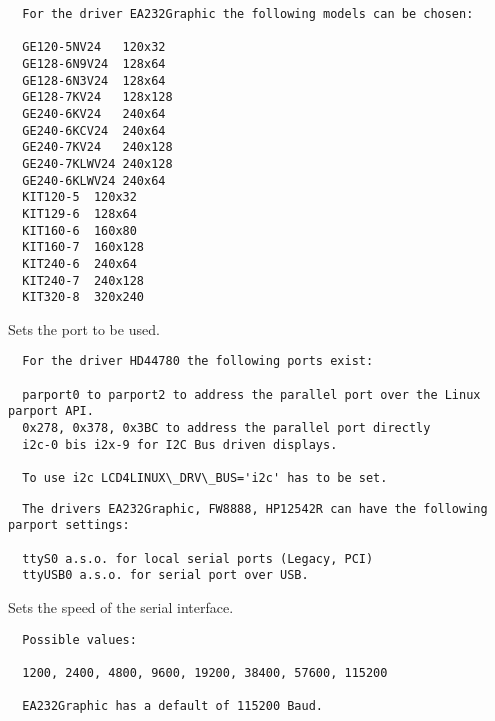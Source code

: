 \begin{description}
\begin{example}
\begin{verbatim}
  For the driver EA232Graphic the following models can be chosen:

  GE120-5NV24	120x32
  GE128-6N9V24	128x64
  GE128-6N3V24	128x64
  GE128-7KV24	128x128
  GE240-6KV24	240x64
  GE240-6KCV24	240x64
  GE240-7KV24	240x128
  GE240-7KLWV24	240x128
  GE240-6KLWV24	240x64
  KIT120-5	120x32
  KIT129-6	128x64
  KIT160-6	160x80
  KIT160-7	160x128
  KIT240-6	240x64
  KIT240-7	240x128
  KIT320-8	320x240
\end{verbatim}
\end{example}


  Sets the port to be used.

\begin{example}
\begin{verbatim}
  For the driver HD44780 the following ports exist:

  parport0 to parport2 to address the parallel port over the Linux parport API.
  0x278, 0x378, 0x3BC to address the parallel port directly
  i2c-0 bis i2x-9 for I2C Bus driven displays.

  To use i2c LCD4LINUX\_DRV\_BUS='i2c' has to be set.
\end{verbatim}
\end{example}

\begin{example}
\begin{verbatim}
  The drivers EA232Graphic, FW8888, HP12542R can have the following parport settings:

  ttyS0 a.s.o. for local serial ports (Legacy, PCI)
  ttyUSB0 a.s.o. for serial port over USB.
\end{verbatim}
\end{example}


  Sets the speed of the serial interface.

\begin{example}
\begin{verbatim}
  Possible values:

  1200, 2400, 4800, 9600, 19200, 38400, 57600, 115200

  EA232Graphic has a default of 115200 Baud.
\end{verbatim}
\end{example}


\end{description}
